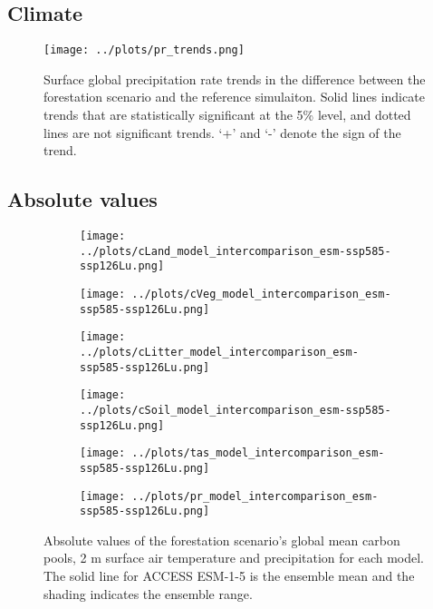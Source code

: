 \documentclass[]{article}
\begin{document}
\subsection{Climate}

\begin{figure}[H]
    \centering
    \texttt{[image: ../plots/pr\_trends.png]}
    \caption{Surface global precipitation rate trends in the difference between the forestation scenario and the reference simulaiton. Solid lines indicate trends that are statistically significant at the 5\% level, and dotted lines are not significant trends. `+' and `-' denote the sign of the trend.}
    \label{fig:models_pr_trends}
\end{figure}

\subsection{Absolute values}

\begin{figure}[H]
    \centering
    \begin{subfigure}[b]{0.45\linewidth}
        \texttt{[image: ../plots/cLand\_model\_intercomparison\_esm-ssp585-ssp126Lu.png]}
    \end{subfigure}
    \begin{subfigure}[b]{0.45\linewidth}
        \texttt{[image: ../plots/cVeg\_model\_intercomparison\_esm-ssp585-ssp126Lu.png]}
    \end{subfigure}
    \begin{subfigure}[b]{0.45\linewidth}
        \texttt{[image: ../plots/cLitter\_model\_intercomparison\_esm-ssp585-ssp126Lu.png]}
    \end{subfigure}
    \begin{subfigure}[b]{0.45\linewidth}
        \texttt{[image: ../plots/cSoil\_model\_intercomparison\_esm-ssp585-ssp126Lu.png]}
    \end{subfigure}
    \begin{subfigure}[b]{0.45\linewidth}
        \texttt{[image: ../plots/tas\_model\_intercomparison\_esm-ssp585-ssp126Lu.png]}
    \end{subfigure}
    \begin{subfigure}[b]{0.45\linewidth}
        \texttt{[image: ../plots/pr\_model\_intercomparison\_esm-ssp585-ssp126Lu.png]}
    \end{subfigure}
    \caption{Absolute values of the forestation scenario's global mean carbon pools, 2 m surface air temperature and precipitation for each model. The solid line for ACCESS ESM-1-5 is the ensemble mean and the shading indicates the ensemble range.}
    \label{fig:models_absolute}
\end{figure}
\end{document}
